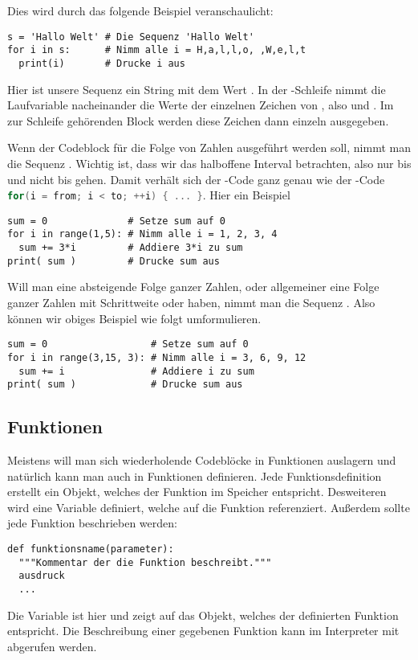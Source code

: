 Dies wird durch das folgende Beispiel veranschaulicht:
\begin{lstlisting}
s = 'Hallo Welt' # Die Sequenz 'Hallo Welt'
for i in s:      # Nimm alle i = H,a,l,l,o, ,W,e,l,t
  print(i)       # Drucke i aus
\end{lstlisting}
Hier ist unsere Sequenz  ein String mit dem Wert . In der -Schleife nimmt die Laufvariable nacheinander
die Werte der einzelnen Zeichen von , also   und . Im zur Schleife gehörenden Block werden 
diese Zeichen dann einzeln ausgegeben.

Wenn der Codeblock für die Folge von Zahlen  ausgeführt werden soll, nimmt man die Sequenz .
Wichtig ist, dass wir das halboffene Interval betrachten, also nur bis  und nicht bis  gehen.
Damit verhält sich der \Python-Code  ganz genau wie der \CC-Code \lstinline[language=C++,style=CPPinline]|for(i = from; i < to; ++i) { ... }|.
Hier ein Beispiel
\begin{lstlisting}
sum = 0              # Setze sum auf 0
for i in range(1,5): # Nimm alle i = 1, 2, 3, 4
  sum += 3*i         # Addiere 3*i zu sum
print( sum )         # Drucke sum aus
\end{lstlisting}

Will man eine absteigende Folge ganzer Zahlen, oder allgemeiner eine Folge ganzer Zahlen mit Schrittweite  oder  haben,
nimmt man die Sequenz .
Also können wir obiges Beispiel wie folgt umformulieren.
\begin{lstlisting}
sum = 0                  # Setze sum auf 0
for i in range(3,15, 3): # Nimm alle i = 3, 6, 9, 12
  sum += i               # Addiere i zu sum
print( sum )             # Drucke sum aus
\end{lstlisting}


\subsection{Funktionen}
\label{section:crashkurs:funktionen}
Meistens will man sich wiederholende Codeblöcke in Funktionen auslagern und natürlich kann man auch in \Python Funktionen definieren.
Jede Funktionsdefinition erstellt ein Objekt, welches der Funktion im Speicher entspricht.
Desweiteren wird eine Variable definiert, welche auf die Funktion referenziert.
Außerdem sollte jede Funktion beschrieben werden:
\begin{lstlisting}
def funktionsname(parameter):
  """Kommentar der die Funktion beschreibt."""
  ausdruck
  ...
\end{lstlisting}
Die Variable ist hier  und zeigt auf das Objekt, welches der definierten Funktion entspricht.
Die Beschreibung einer gegebenen Funktion  kann im Interpreter mit  abgerufen werden.

